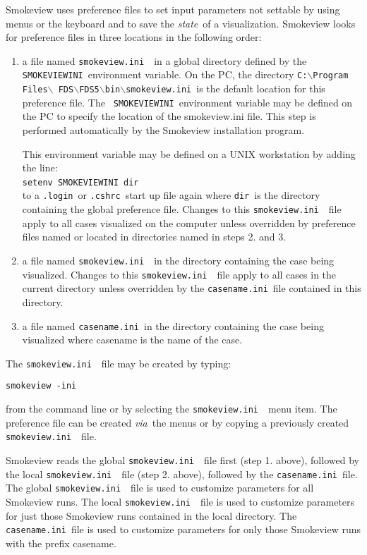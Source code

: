 \documentclass[11pt,twoside]{book}
\newcommand{\svini}{{\tt smokeview.ini}\ }
\begin{document}
Smokeview uses preference files to set input parameters not
settable by using menus or the keyboard and to save the {\em
state}\ of a visualization. Smokeview looks for preference files
in three locations in the following order:
\begin{enumerate}

\item a file named \svini\ in a global directory defined by the
{\tt SMOKEVIEWINI}\ environment variable. On the PC, the directory
{\tt C:$\backslash$Program Files$\backslash$
FDS$\backslash$FDS5$\backslash$bin$\backslash$smokeview.ini}\ is
the default location for this preference file. The {\tt
SMOKEVIEWINI}\ environment variable may be defined on the PC to
specify the location of the smokeview.ini file. This step is
performed automatically by the Smokeview installation program.

This environment variable may be
defined on a UNIX workstation by adding the line:\\

{\tt setenv SMOKEVIEWINI dir}\ \\

to a {\tt .login}\  or {\tt .cshrc}\ start up file
again where {\tt dir}\ is the directory containing the
global preference file. Changes to this \svini\
file apply to all cases visualized on the computer unless
overridden by preference files named or located in
directories named in steps 2. and  3.

\item a file named \svini\ in the directory
containing the case being visualized.  Changes to
this \svini\ file apply to all cases in the current
directory unless overridden by the {\tt casename.ini}\ file
contained in this directory.

\item a file named {\tt casename.ini}\ in the directory containing the case being
visualized where casename is the name of the case.
\end{enumerate}

The \svini\ file may be created by typing:
\begin{lstlisting}
smokeview -ini
\end{lstlisting}
\noindent from the command line or by selecting the \svini\ menu item.
The \fbox{\tt casename.ini}
preference file can be created {\em via}\ the menus or by copying a
previously created \svini\ file.

Smokeview reads the global \svini\ file first (step 1. above),
followed by the local \svini\ file (step 2. above), followed by
the {\tt casename.ini}\ file. The global \svini\ file is used to
customize parameters for all Smokeview runs. The local \svini\
file is used to customize parameters for just those Smokeview runs
contained in the local directory. The {\tt casename.ini}\ file is
used to customize parameters for only those Smokeview runs with
the prefix casename.
\end{document}
